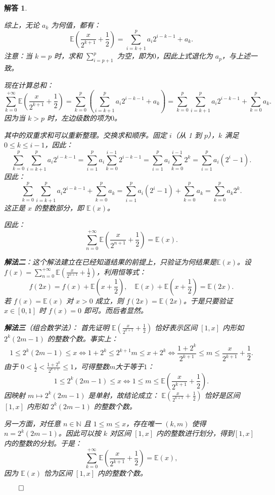 \documentclass[12pt,UTF8]{ctexbook}
\theoremstyle{exercisestyle}
\theoremstyle{solutionstyle}
\newtheorem*{solution*}{解答}
\newenvironment{solution}
  {\begin{solution*}}
  {\hfill\ensuremath{\qed}\end{solution*}}
\begin{document}
\begin{solution}
\begin{subquestions}
综上，无论 $a_k$ 为何值，都有：
$$
\mathbb{E}\left(\frac{x}{2^{k+1}} + \frac{1}{2}\right) = \sum_{i=k+1}^{p} a_i 2^{i - k - 1} + a_k.
$$
注意：当 $k = p$ 时，求和 $\sum_{i=p+1}^{p}$ 为空，即为$0$，因此上式退化为 $a_p$，与上述一致。

现在计算总和：
$$
\sum_{k=0}^{+\infty} \mathbb{E}\left(\frac{x}{2^{k+1}} + \frac{1}{2}\right) = \sum_{k=0}^{p} \left( \sum_{i=k+1}^{p} a_i 2^{i - k - 1} + a_k \right) = \sum_{k=0}^{p} \sum_{i=k+1}^{p} a_i 2^{i - k - 1} + \sum_{k=0}^{p} a_k.
$$
因为当 $k > p$ 时，左边级数的项为$0$。

其中的双重求和可以重新整理。交换求和顺序。固定 $i$（从 1 到 $p$），$k$ 满足 $0 \leq k \leq i-1$，因此：
$$
\sum_{k=0}^{p} \sum_{i=k+1}^{p} a_i 2^{i - k - 1} = \sum_{i=1}^{p} a_i \sum_{k=0}^{i-1} 2^{i - k - 1} = \sum_{i=1}^{p} a_i \sum_{k=0}^{i-1} 2^k = \sum_{i=1}^{p} a_i\left(2^i - 1\right).
$$
因此：
$$
\sum_{k=0}^{p} \sum_{i=k+1}^{p} a_i 2^{i - k - 1} + \sum_{k=0}^{p} a_k = \sum_{i=1}^{p} a_i\left(2^i - 1\right) + \sum_{k=0}^{p} a_k = \sum_{k=0}^{p} a_k 2^k.
$$
这正是 $x$ 的整数部分，即 $\mathbb{E}(x)$。

因此：
$$
\sum_{n=0}^{+\infty} \mathbb{E}\left(\frac{x}{2^{n+1}} + \frac{1}{2}\right) = \mathbb{E}(x).
$$

\item \textbf{解法二}：这个解法建立在已经知道结果的前提上，只验证为何结果是$\mathbb{E}(x)$。设 $f(x) = \sum_{n=0}^{+\infty} \mathbb{E}\left(\frac{x}{2^{n+1}} + \frac{1}{2}\right)$，利用恒等式：
$$
f(2x) = f(x) + \mathbb{E}\left(x + \frac{1}{2}\right), \quad \mathbb{E}(x) + \mathbb{E}\left(x + \frac{1}{2}\right) = \mathbb{E}(2x).
$$
若 $f(x) = \mathbb{E}(x)$ 对 $x > 0$ 成立，则 $f(2x) = \mathbb{E}(2x)$。于是只要验证 $x \in [0,1]$ 时 $f(x) = 0$ 即可。而后者显然。

\item \textbf{解法三}（组合数学法）：
首先证明 $\mathbb{E}\left(\frac{x}{2^{k+1}} + \frac{1}{2}\right)$ 恰好表示区间 $[1,x]$ 内形如 $ 2^{k}(2m - 1)$ 的整数个数。事实上：
$$
1 \leqslant 2^{k}(2m-1) \leqslant x 
\Longleftrightarrow 1 + 2^{k} \leqslant 2^{k+1}m \leqslant x + 2^{k}
\iff \frac{1 + 2^{k}}{2^{k+1}} \leqslant m \leqslant \frac{x}{2^{k+1}} + \frac{1}{2}.
$$
由于 $\displaystyle 0 < \frac{1}{2} < \frac{1+2^k}{2^{k+1}} \leqslant 1$，可得整数$m$大于等于$1$：
$$
1 \leqslant 2^{k}(2m-1) \leqslant x 
\Longleftrightarrow 1 \leqslant m \leqslant \mathbb{E}\left(\frac{x}{2^{k+1}} + \frac{1}{2}\right).
$$
因映射 $m \mapsto 2^k(2m-1)$ 是单射，故结论成立： $\mathbb{E}\left(\frac{x}{2^{k+1}} + \frac{1}{2}\right)$ 恰好是区间 $[1,x]$ 内形如 $ 2^{k}(2m - 1)$ 的整数个数。

另一方面，对任意 $n \in \mathbb{N}$ 且 $1 \leqslant m \leqslant x$，存在唯一 $(k, m)$ 使得 $n = 2^{k}(2m - 1)$。因此可以按 $k$ 对区间 $[1,x]$ 内的整数进行划分，得到$[1,x]$ 内的整数的分划。于是：
$$
\sum_{k=0}^{+\infty} \mathbb{E}\left(\frac{x}{2^{k+1}} + \frac{1}{2}\right) = \mathbb{E}(x),
$$
因为 $\mathbb{E}(x)$ 恰为区间 $[1,x]$ 内的整数个数。
\end{subquestions}
\end{solution}
\end{document}
